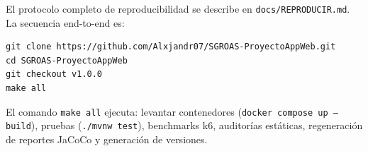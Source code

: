 El protocolo completo de reproducibilidad se describe en \texttt{docs/REPRODUCIR.md}. La secuencia end-to-end es:

\begin{verbatim}
git clone https://github.com/Alxjandr07/SGROAS-ProyectoAppWeb.git
cd SGROAS-ProyectoAppWeb
git checkout v1.0.0
make all
\end{verbatim}

El comando \texttt{make all} ejecuta: levantar contenedores (\texttt{docker compose up --build}), pruebas (\texttt{./mvnw test}), benchmarks k6, auditorías estáticas, regeneración de reportes JaCoCo y generación de versiones.
